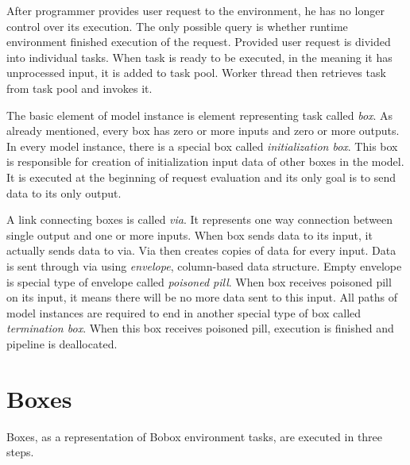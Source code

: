 After programmer provides user request to the environment, he has no longer control over its execution. The only possible query is whether runtime environment finished execution of the request. Provided user request is divided into individual tasks. When task is ready to be executed, in the meaning it has unprocessed input, it is added to task pool. Worker thread then retrieves task from task pool and invokes it.

The basic element of model instance is element representing task called \emph{box}.  As already mentioned, every box has zero or more inputs and zero or more outputs. In every model instance, there is a special box called \emph{initialization box}. This box is responsible for creation of initialization input data of other boxes in the model. It is executed at the beginning of request evaluation and its only goal is to send data to its only output.

A link connecting boxes is called \emph{via}. It represents one way connection between single output and one or more inputs. When box sends data to its input, it actually sends data to via. Via then creates copies of data for every input. Data is sent through via using \emph{envelope}, column-based data structure. Empty envelope is special type of envelope called \emph{poisoned pill}. When box receives poisoned pill on its input, it means there will be no more data sent to this input. All paths of model instances are required to end in another special type of box called \emph{termination box}. When this box receives poisoned pill, execution is finished and pipeline is deallocated.

\section{Boxes}
Boxes, as a representation of Bobox environment tasks, are executed in three steps.

